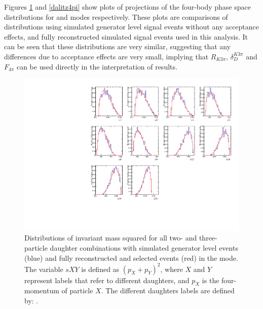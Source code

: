 Figures \ref{dalitzk3pi} and \ref{dalitz4pi} show plots of projections of the four-body phase space distributions for \kpipipi and \pipipipi modes respectively. These plots are comparisons of distributions using simulated generator level signal events without any acceptance effects, and fully reconstructed simulated signal events used in this analysis. It can be seen that these distributions are very similar, suggesting that any differences due to \lhcb acceptance effects are very small, implying that $R_{K3\pi}$, $\delta_D^{K3\pi}$ and $F_{4\pi}$ can be used directly in the interpretation of \lhcb results.

\begin{figure}[h]
\centering
\includegraphics[width=0.9\linewidth]{figures/results/dalitzDist_KPiPiPi.pdf}
\caption{Distributions of invariant mass squared for all two- and three-particle \Dz daughter combinations with simulated generator level events (blue) and fully reconstructed and selected events (red) in the \kpipipi mode. The variable $sXY$ is defined as $(p_X + p_Y)^2$, where $X$ and $Y$ represent labels that refer to different \Dz daughters, and $p_X$ is the four-momentum of particle $X$. The different \Dz daughters labels are defined by: .}
\label{dalitzk3pi}
\end{figure}

